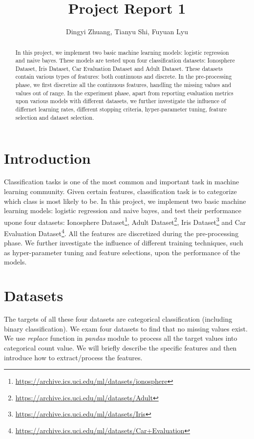 \documentclass[11pt]{scrartcl}
\title{Project Report 1}
\author{Dingyi Zhuang, Tianyu Shi, Fuyuan Lyu}
\begin{document}
\maketitle

\begin{abstract}
In this project, we implement two basic machine learning models: logistic regression and naive bayes. These models are tested upon four classification datasets: Ionosphere Dataset, Iris Dataset, Car Evaluation Dataset and Adult Dataset. These datasets contain various types of features: both continuous and discrete. In the pre-processing phase, we first discretize all the continuous features, handling the missing values and values out of range. In the experiment phase, apart from reporting evaluation metrics upon various models with different datasets, we further investigate the influence of differnet learning rates, different stopping criteria, hyper-parameter tuning, feature selection and dataset selection.

\end{abstract}

\section{Introduction}
Classification tasks is one of the most common and important task in machine learning community. Given certain features, classification task is to categorize which class is most likely to be. In this project, we implement two basic machine learning models: logistic regression and naive bayes, and test their performance upone four datasets: Ionosphere Dataset\footnote{\url{https://archive.ics.uci.edu/ml/datasets/ionosphere}}, Adult Dataset\footnote{\url{https://archive.ics.uci.edu/ml/datasets/Adult}}, Iris Dataset\footnote{\url{https://archive.ics.uci.edu/ml/datasets/Iris}} and Car Evaluation Dataset\footnote{\url{https://archive.ics.uci.edu/ml/datasets/Car+Evaluation}}. All the features are discretized during the pre-processing phase. We further investigate the influence of different training techniques, such as hyper-parameter tuning and feature selections, upon the performance of the models.

\section{Datasets}
The targets of all these four datasets are categorical classification (including binary classification). We exam four datasets to find that no missing values exist. We use \textit{replace} function in \textit{pandas} module to process all the target values into categorical count value. We will briefly describe the specific features and then introduce how to extract/process the features.
\end{document}
